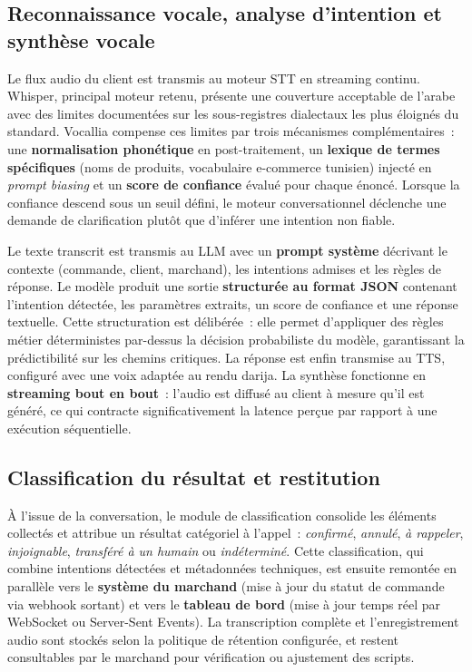 \subsection{Reconnaissance vocale, analyse d'intention et synthèse vocale}
\label{subsec:pipeline_coeur}

Le flux audio du client est transmis au moteur STT en streaming continu. Whisper, principal moteur retenu, présente une couverture acceptable de l'arabe avec des limites documentées sur les sous-registres dialectaux les plus éloignés du standard. Vocallia compense ces limites par trois mécanismes complémentaires~: une \textbf{normalisation phonétique} en post-traitement, un \textbf{lexique de termes spécifiques} (noms de produits, vocabulaire e-commerce tunisien) injecté en \emph{prompt biasing} et un \textbf{score de confiance} évalué pour chaque énoncé. Lorsque la confiance descend sous un seuil défini, le moteur conversationnel déclenche une demande de clarification plutôt que d'inférer une intention non fiable.

Le texte transcrit est transmis au LLM avec un \textbf{prompt système} décrivant le contexte (commande, client, marchand), les intentions admises et les règles de réponse. Le modèle produit une sortie \textbf{structurée au format JSON} contenant l'intention détectée, les paramètres extraits, un score de confiance et une réponse textuelle. Cette structuration est délibérée~: elle permet d'appliquer des règles métier déterministes par-dessus la décision probabiliste du modèle, garantissant la prédictibilité sur les chemins critiques. La réponse est enfin transmise au TTS, configuré avec une voix adaptée au rendu darija. La synthèse fonctionne en \textbf{streaming bout en bout}~: l'audio est diffusé au client à mesure qu'il est généré, ce qui contracte significativement la latence perçue par rapport à une exécution séquentielle.

\subsection{Classification du résultat et restitution}
\label{subsec:pipeline_aval}

À l'issue de la conversation, le module de classification consolide les éléments collectés et attribue un résultat catégoriel à l'appel~: \emph{confirmé}, \emph{annulé}, \emph{à rappeler}, \emph{injoignable}, \emph{transféré à un humain} ou \emph{indéterminé}. Cette classification, qui combine intentions détectées et métadonnées techniques, est ensuite remontée en parallèle vers le \textbf{système du marchand} (mise à jour du statut de commande via webhook sortant) et vers le \textbf{tableau de bord} (mise à jour temps réel par WebSocket ou Server-Sent Events). La transcription complète et l'enregistrement audio sont stockés selon la politique de rétention configurée, et restent consultables par le marchand pour vérification ou ajustement des scripts.

